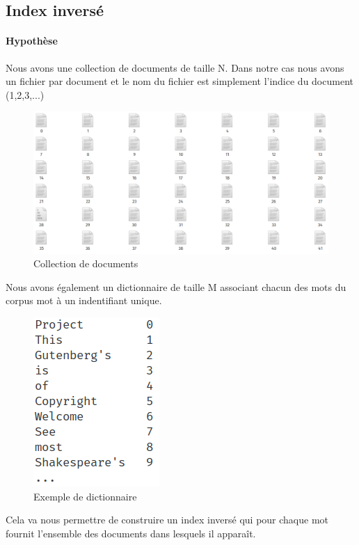 \documentclass[12pt,french,titlepage]{article}
\begin{document}
\subsection{Index inversé}
\paragraph{Hypothèse}Nous avons une collection de documents de taille N. Dans notre cas nous avons un fichier par document et le nom du fichier est simplement l'indice du document (1,2,3,...)
\begin{figure}[H]
    \centering
    \includegraphics[scale=0.45]{images/corpus}
    \caption{Collection de documents}
\end{figure}
Nous avons également un dictionnaire de taille M associant chacun des mots du corpus mot à un indentifiant unique.
\begin{figure}[H]
    \centering
    \includegraphics[scale=0.75]{images/dictionnaire}
    \caption{Exemple de dictionnaire}
\end{figure}

Cela va nous permettre de construire un index inversé qui pour chaque mot fournit l’ensemble des documents dans lesquels il apparaît.
\end{document}
